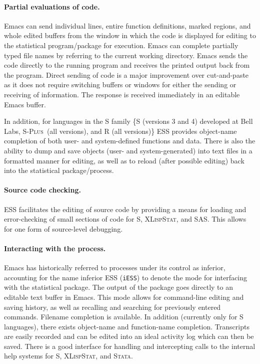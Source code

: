 \documentclass{article}
\newcommand*{\Splus}{\textsc{S-Plus}}
\newcommand*{\XLispStat}{\textsc{XLispStat}}
\newcommand*{\Stata}{\textsc{Stata}}
\newcommand{\stexttt}[1]{{\small\texttt{#1}}}
\begin{document}
\paragraph{Partial evaluations of code.}
Emacs can send individual lines, entire function definitions, marked
regions, and whole edited buffers from the window in which the code is
displayed for editing to the statistical program/package for
execution.  Emacs can complete partially typed file names by referring
to the current working directory.  Emacs sends the code directly to
the running program and receives the printed output back from the
program.  Direct sending of code is a major improvement over
cut-and-paste as it does not require switching buffers or windows for
either the sending or receiving of information.  The response is
received immediately in an editable Emacs buffer.

In addition, for languages in the S family \{S (versions 3 and 4)
developed at Bell Labs, \Splus\ (all versions), and R (all versions)\}
ESS provides object-name completion of both user- and system-defined
functions and data.  There is also the ability to dump and save
objects (user- and system-generated) into text files in a formatted
manner for editing, as well as to reload (after possible editing) back
into the statistical package/process.

\paragraph{Source code checking.}
ESS facilitates the editing of source code by providing a means
for loading and error-checking of small sections of code for S,
\XLispStat, and SAS.  This allows for one form of source-level
debugging.

\paragraph{Interacting with the process.}
Emacs has historically referred to processes under its control as
inferior, accounting for the name inferior ESS (\stexttt{iESS}) to
denote the mode for interfacing with the statistical package.  The
output of the package goes directly to an editable text buffer in
Emacs.  This mode allows for command-line editing and saving history,
as well as recalling and searching for previously entered commands.
Filename completion is available.  In addition (currently only for
S languages), there exists object-name and function-name completion.
Transcripts are easily recorded and can be edited into an ideal
activity log which can then be saved.  There is a good interface for
handling and intercepting calls to the internal help systems for S,
\XLispStat, and \Stata.
\end{document}
